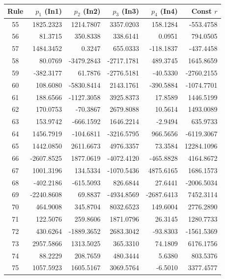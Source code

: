 \documentclass[12pt]{article}
\begin{document}
\begin{table}[H]
\centering
\small
\setlength{\tabcolsep}{4pt}
\begin{tabular}{|c|r|r|r|r|r|}
\hline
\textbf{Rule} & \textbf{$p_1$ (In1)} & \textbf{$p_2$ (In2)} & \textbf{$p_3$ (In3)} & \textbf{$p_4$ (In4)} & \textbf{Const $r$} \\ \hline
55 & 1825.2323 & 1214.7807 & 3357.0203 & 158.1284 & -553.4758 \\ \hline
56 & 81.3715 & 350.8338 & 338.6141 & 0.0951 & 794.0505 \\ \hline
57 & 1484.3452 & 0.3247 & 655.0333 & -118.1837 & -437.4458 \\ \hline
58 & 80.0769 & -3479.2843 & -2717.1781 & 489.3745 & 1645.8659 \\ \hline
59 & -382.3177 & 61.7876 & -2776.5181 & -40.5330 & -2760.2155 \\ \hline
60 & 108.6080 & -5830.8414 & 2143.1761 & -390.5884 & -1074.7701 \\ \hline
61 & 188.6566 & -1127.3058 & 3925.8373 & 17.8589 & 1446.5199 \\ \hline
62 & 170.0753 & -70.3867 & 2679.8088 & 10.5614 & 1493.0089 \\ \hline
63 & 153.9742 & -666.1592 & 1646.2214 & -2.9494 & 635.9733 \\ \hline
64 & 1456.7919 & -104.6811 & -3216.5795 & 966.5656 & -6119.3067 \\ \hline
65 & 1442.0850 & 2611.6673 & 4976.3357 & 73.3584 & 12284.1096 \\ \hline
66 & -2607.8525 & 1877.0619 & -4072.4120 & -465.8828 & 4164.8672 \\ \hline
67 & 1001.3196 & 134.5334 & -1070.5436 & 4875.6165 & 1686.1573 \\ \hline
68 & -402.2186 & -615.5093 & 826.6844 & 27.6441 & -2006.5034 \\ \hline
69 & -2240.8608 & 69.8837 & -4934.8569 & -2687.6413 & 7452.3114 \\ \hline
70 & 464.9008 & 345.8704 & 8032.6523 & 149.6004 & 2776.2890 \\ \hline
71 & 122.5076 & 259.8606 & 1871.0796 & 26.3145 & 1280.7733 \\ \hline
72 & 430.6264 & -1889.3652 & 2683.3042 & -93.8303 & -1561.5369 \\ \hline
73 & 2957.5866 & 1313.5025 & 365.3310 & 74.1809 & 6176.1756 \\ \hline
74 & 88.2229 & 208.7659 & 480.3444 & 5.6380 & 803.5376 \\ \hline
75 & 1057.5923 & 1605.5167 & 3069.5764 & -6.5010 & 3377.4577 \\ \hline

\end{tabular}
\end{table}
\end{document}
